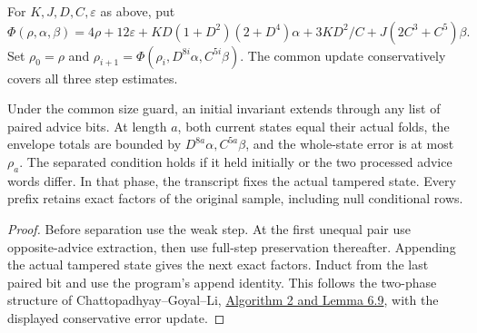 \begin{definition}
  \label{def:lowerbounds-algebraic-advice-recurrence}
  \leanok
  For $K,J,D,C,\varepsilon$ as above, put
  \[
    \Phi(\rho,\alpha,\beta)=4\rho+12\varepsilon+
      KD(1+D^2)(2+D^4)\alpha+3KD^2/C+J(2C^3+C^5)\beta.
  \]
  Set $\rho_0=\rho$ and
  $\rho_{i+1}=\Phi(\rho_i,D^{8i}\alpha,C^{5i}\beta)$.
  The common update conservatively covers all three step estimates.
\end{definition}

\begin{theorem}
  \label{thm:lowerbounds-algebraic-advice-invariant}
  \leanok
  Under the common size guard, an initial invariant extends through any
  list of paired advice bits. At length $a$, both current states equal
  their actual folds, the envelope totals are bounded by
  $D^{8a}\alpha,C^{5a}\beta$, and the whole-state error is at most
  $\rho_a$. The separated condition holds if it held initially or the
  two processed advice words differ. In that phase, the transcript fixes
  the actual tampered state. Every prefix retains exact factors of the
  original sample, including null conditional rows.
\end{theorem}
\begin{proof}
  \leanok
  Before separation use the weak step. At the first unequal pair use
  opposite-advice extraction, then use full-step preservation thereafter.
  Appending the actual tampered state gives the next exact factors. Induct
  from the last paired bit and use the program's append identity.
  This follows the two-phase structure of Chattopadhyay--Goyal--Li,
  \href{https://arxiv.org/pdf/1505.00107}{Algorithm 2 and Lemma 6.9},
  with the displayed conservative error update.
\end{proof}

